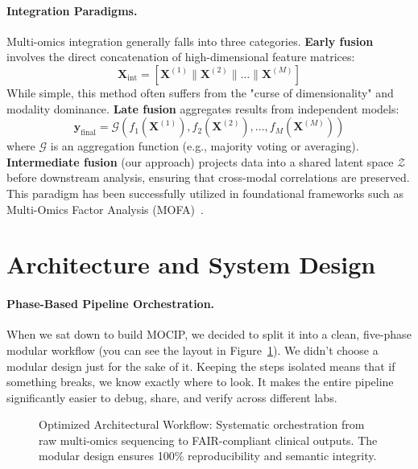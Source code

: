 \documentclass[12pt,a4paper,onecolumn]{article}
\begin{document}
\paragraph{Integration Paradigms.}
Multi-omics integration generally falls into three categories.
\textbf{Early fusion} involves the direct concatenation of high-dimensional feature matrices:
\begin{equation}
\mathbf{X}_{\text{int}} = \left[ \mathbf{X}^{(1)} \parallel \mathbf{X}^{(2)} \parallel \dots \parallel \mathbf{X}^{(M)} \right]
\end{equation}
While simple, this method often suffers from the "curse of dimensionality" and modality dominance.
\textbf{Late fusion} aggregates results from independent models:
\begin{equation}
\mathbf{y}_{\text{final}} = \mathcal{G}(f_1(\mathbf{X}^{(1)}), f_2(\mathbf{X}^{(2)}), \dots, f_M(\mathbf{X}^{(M)}))
\end{equation}
where $\mathcal{G}$ is an aggregation function (e.g., majority voting or averaging).
\textbf{Intermediate fusion} (our approach) projects data into a shared latent space $\mathcal{Z}$ before downstream analysis, ensuring that cross-modal correlations are preserved. This paradigm has been successfully utilized in foundational frameworks such as Multi-Omics Factor Analysis (MOFA)~\cite{argelaguet2018}.

\section{Architecture and System Design}

\paragraph{Phase-Based Pipeline Orchestration.}
When we sat down to build MOCIP, we decided to split it into a clean, five-phase modular workflow (you can see the layout in Figure~\ref{fig:pipeline_dag}). We didn't choose a modular design just for the sake of it. Keeping the steps isolated means that if something breaks, we know exactly where to look. It makes the entire pipeline significantly easier to debug, share, and verify across different labs.

\begin{figure}[H]
\centering
{}
\caption{Optimized Architectural Workflow: Systematic orchestration from raw multi-omics sequencing to FAIR-compliant clinical outputs. The modular design ensures 100\% reproducibility and semantic integrity.}\label{fig:pipeline_dag}
\end{figure}
\end{document}
